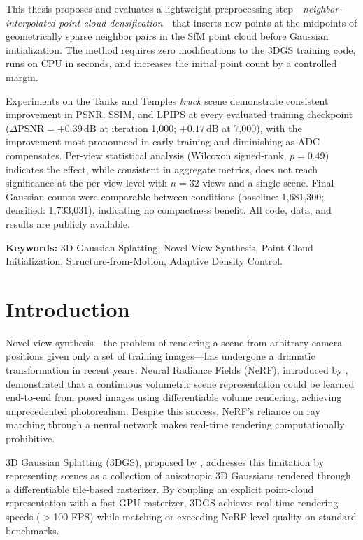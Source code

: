 \documentclass[12pt, a4paper]{article}
\begin{document}
This thesis proposes and evaluates a lightweight preprocessing step---\textit{neighbor-interpolated point cloud densification}---that inserts new points at the
midpoints of geometrically sparse neighbor pairs in the SfM point cloud before
Gaussian initialization. The method requires zero modifications to the 3DGS training
code, runs on CPU in seconds, and increases the initial point count by a controlled
margin.

Experiments on the Tanks and Temples \textit{truck} scene demonstrate consistent
improvement in PSNR, SSIM, and LPIPS at every evaluated training checkpoint
($\Delta\text{PSNR} = +0.39\,\text{dB}$ at iteration 1{,}000;
$+0.17\,\text{dB}$ at 7{,}000), with the improvement most pronounced in early
training and diminishing as ADC compensates. Per-view statistical analysis
(Wilcoxon signed-rank, $p = 0.49$) indicates the effect, while consistent in
aggregate metrics, does not reach significance at the per-view level with $n = 32$
views and a single scene. Final Gaussian counts were comparable between conditions
(baseline: 1{,}681{,}300; densified: 1{,}733{,}031), indicating no compactness
benefit. All code, data, and results are publicly available.

\textbf{Keywords:} 3D Gaussian Splatting, Novel View Synthesis, Point Cloud
Initialization, Structure-from-Motion, Adaptive Density Control.

\newpage

\section{Introduction}

Novel view synthesis---the problem of rendering a scene from arbitrary camera
positions given only a set of training images---has undergone a dramatic
transformation in recent years. Neural Radiance Fields (NeRF), introduced by
\citet{mildenhall2020nerf}, demonstrated that a continuous volumetric scene
representation could be learned end-to-end from posed images using differentiable
volume rendering, achieving unprecedented photorealism. Despite this success,
NeRF's reliance on ray marching through a neural network makes real-time rendering
computationally prohibitive.

3D Gaussian Splatting (3DGS), proposed by \citet{kerbl20233dgs}, addresses this
limitation by representing scenes as a collection of anisotropic 3D Gaussians
rendered through a differentiable tile-based rasterizer. By coupling an explicit
point-cloud representation with a fast GPU rasterizer, 3DGS achieves real-time
rendering speeds ($>$100 FPS) while matching or exceeding NeRF-level quality on
standard benchmarks.
\end{document}
